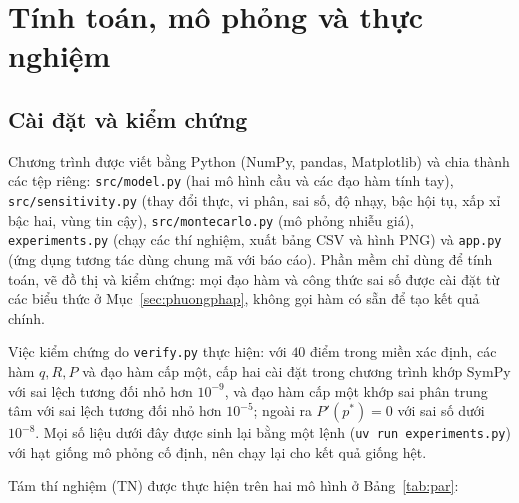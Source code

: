 \section{Tính toán, mô phỏng và thực nghiệm}\label{sec:thucnghiem}

\subsection{Cài đặt và kiểm chứng}
Chương trình được viết bằng Python (NumPy, pandas, Matplotlib) và chia thành các tệp
riêng: \texttt{src/model.py} (hai mô hình cầu và các đạo hàm tính tay),
\texttt{src/sensitivity.py} (thay đổi thực, vi phân, sai số, độ nhạy, bậc hội tụ, xấp xỉ
bậc hai, vùng tin cậy), \texttt{src/montecarlo.py} (mô phỏng nhiễu giá),
\texttt{experiments.py} (chạy các thí nghiệm, xuất bảng CSV và hình PNG) và
\texttt{app.py} (ứng dụng tương tác dùng chung mã với báo cáo). Phần mềm chỉ dùng để
tính toán, vẽ đồ thị và kiểm chứng: mọi đạo hàm và công thức sai số được cài đặt từ
các biểu thức ở Mục~\ref{sec:phuongphap}, không gọi hàm có sẵn để tạo kết quả chính.

Việc kiểm chứng do \texttt{verify.py} thực hiện: với $40$ điểm trong miền xác định, các hàm
$q,R,P$ và đạo hàm cấp một, cấp hai cài đặt trong chương trình khớp SymPy với sai lệch
tương đối nhỏ hơn $10^{-9}$, và đạo hàm cấp một khớp sai phân trung tâm với sai lệch
tương đối nhỏ hơn $10^{-5}$; ngoài ra $P'(p^*)=0$ với sai số dưới $10^{-8}$.
Mọi số liệu dưới đây được sinh lại bằng một lệnh (\texttt{uv run experiments.py}) với hạt
giống mô phỏng cố định, nên chạy lại cho kết quả giống hệt.

Tám thí nghiệm (TN) được thực hiện trên hai mô hình ở Bảng~\ref{tab:par}:

